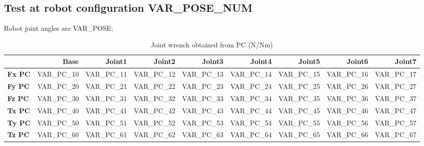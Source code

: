 

\subsection{Test at robot configuration VAR_POSE_NUM}
Robot joint angles are  VAR_POSE;

\begin{table}[h!]
	\centering
	\caption{Joint wrench obtained from PC (N/Nm)}
	\label{VAR_LABEL_PC}
	\begin{tabular}{|l|r|r|r|r|r|r|r|r|}
		\hline
		\textbf{}  & \textbf{Base} & \textbf{Joint1}  & \textbf{Joint2}  & \textbf{Joint3}  & \textbf{Joint4}  & \textbf{Joint5}  & \textbf{Joint6}  & \textbf{Joint7} \\ \hline
		\textbf{Fx PC}  & VAR_PC_10        & VAR_PC_11        & VAR_PC_12        & VAR_PC_13        & VAR_PC_14        & VAR_PC_15        & VAR_PC_16        & VAR_PC_17 \\ \hline
		\textbf{Fy PC}  & VAR_PC_20        & VAR_PC_21        & VAR_PC_22        & VAR_PC_23        & VAR_PC_24        & VAR_PC_25        & VAR_PC_26        & VAR_PC_27 \\ \hline
		\textbf{Fz PC}  & VAR_PC_30        & VAR_PC_31        & VAR_PC_32        & VAR_PC_33        & VAR_PC_34        & VAR_PC_35        & VAR_PC_36        & VAR_PC_37 \\ \hline
		\textbf{Tx PC}  & VAR_PC_40        & VAR_PC_41        & VAR_PC_42        & VAR_PC_43        & VAR_PC_44        & VAR_PC_45        & VAR_PC_46        & VAR_PC_47 \\ \hline
		\textbf{Ty PC}  & VAR_PC_50        & VAR_PC_51        & VAR_PC_52        & VAR_PC_53        & VAR_PC_54        & VAR_PC_55        & VAR_PC_56        & VAR_PC_57 \\ \hline
		\textbf{Tz PC}  & VAR_PC_60        & VAR_PC_61        & VAR_PC_62        & VAR_PC_63        & VAR_PC_64        & VAR_PC_65        & VAR_PC_66        & VAR_PC_67 \\ \hline
	\end{tabular}
\end{table}


